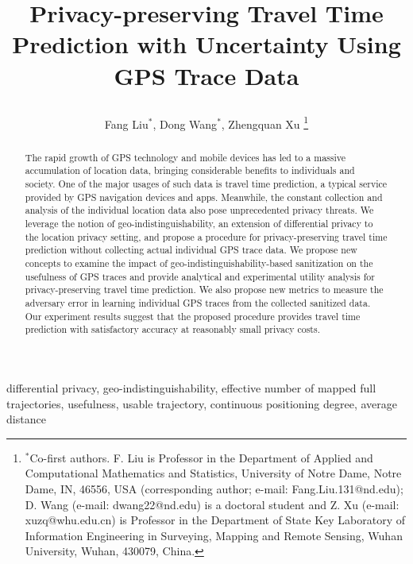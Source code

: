 \documentclass[10pt,journal,compsoc]{IEEEtran}
\begin{document}
\title{Privacy-preserving Travel Time Prediction with Uncertainty Using GPS Trace Data\\
\author{Fang Liu$^*$,  Dong Wang$^*$,  Zhengquan Xu
\thanks{$^*$Co-first authors.  F. Liu is Professor in the Department of Applied and Computational Mathematics and Statistics, University of Notre Dame, Notre Dame, IN, 46556, USA  (corresponding author; e-mail: Fang.Liu.131@nd.edu); D. Wang  (e-mail: dwang22@nd.edu)  is a doctoral student and Z. Xu  (e-mail: xuzq@whu.edu.cn) is Professor in the Department of State Key Laboratory of Information Engineering
in Surveying, Mapping and Remote Sensing, Wuhan University, Wuhan, 430079, China.}\vspace{-18pt}
}}
\maketitle
\vspace{-36pt}
\begin{abstract}
The rapid growth of GPS technology and mobile devices has led to a massive accumulation of location data, bringing considerable benefits to individuals and society. One of the major usages of such data is travel time prediction, a typical service provided by GPS navigation devices and apps.  Meanwhile, the constant collection and analysis of the individual location data also pose unprecedented privacy threats. We leverage the notion of geo-indistinguishability, an extension of differential privacy to the location privacy setting, and propose a procedure for privacy-preserving travel time prediction without collecting actual individual GPS trace data. We propose new concepts to examine the impact of geo-indistinguishability-based sanitization on the usefulness of GPS traces and provide analytical and experimental utility analysis for privacy-preserving travel time prediction. We also propose new metrics  to measure the adversary error in learning individual GPS traces from the collected sanitized data. Our experiment results suggest that the proposed procedure provides travel time prediction with  satisfactory accuracy at reasonably small privacy costs.
\end{abstract} \vspace{-3pt}
\begin{IEEEkeywords}
 differential privacy, geo-indistinguishability, effective number of mapped full trajectories, usefulness, usable trajectory, continuous positioning degree, average distance
\end{IEEEkeywords}
\end{document}
